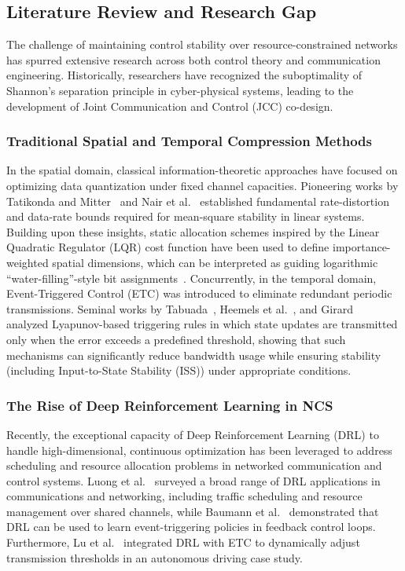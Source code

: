 \subsection{Literature Review and Research Gap}
The challenge of maintaining control stability over resource-constrained networks has spurred extensive research across both control theory and communication engineering. 
Historically, researchers have recognized the suboptimality of Shannon's separation principle in cyber-physical systems, leading to the development of Joint Communication and Control (JCC) co-design.
\subsubsection{Traditional Spatial and Temporal Compression Methods}
In the spatial domain, classical information-theoretic approaches have focused on optimizing data quantization under fixed channel capacities. Pioneering works by Tatikonda and Mitter~\cite{intro_cucc} and Nair et al.~\cite{FCUDRC} established fundamental rate-distortion and data-rate bounds required for mean-square stability in linear systems. Building upon these insights, static allocation schemes inspired by the Linear Quadratic Regulator (LQR) cost function have been used to define importance-weighted spatial dimensions, which can be interpreted as guiding logarithmic ``water-filling''-style bit assignments~\cite{OCFD}.
Concurrently, in the temporal domain, Event-Triggered Control (ETC) was introduced to eliminate redundant periodic transmissions. Seminal works by Tabuada~\cite{method_etrs}, Heemels et al.~\cite{AIETSC}, and Girard~\cite{DTMEC} analyzed Lyapunov-based triggering rules in which state updates are transmitted only when the error exceeds a predefined threshold, showing that such mechanisms can significantly reduce bandwidth usage while ensuring stability (including Input-to-State Stability (ISS)) under appropriate conditions.
\subsubsection{The Rise of Deep Reinforcement Learning in NCS}
Recently, the exceptional capacity of Deep Reinforcement Learning (DRL) to handle high-dimensional, continuous optimization has been leveraged to address scheduling and resource allocation problems in networked communication and control systems. Luong et al.~\cite{ADRLCN} surveyed a broad range of DRL applications in communications and networking, including traffic scheduling and resource management over shared channels, while Baumann et al.~\cite{intro_drl} demonstrated that DRL can be used to learn event-triggering policies in feedback control loops. Furthermore, Lu et al.~\cite{ETDRL} integrated DRL with ETC to dynamically adjust transmission thresholds in an autonomous driving case study.
